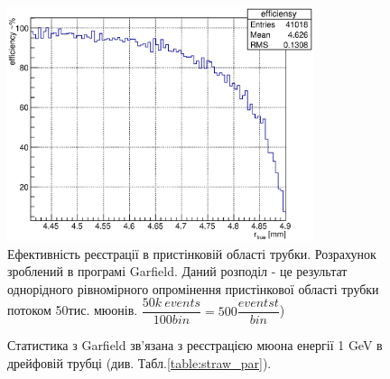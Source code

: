 \documentclass[pdftex,14pt]{scrartcl}
\begin{document}
	\begin{figure}[h!]
	\centering
	\includegraphics[width=0.8\textwidth]{periffEff}
	\caption{ Ефективність реєстрації в пристінковій області трубки. Розрахунок зроблений в програмі Garfield. Даний розподіл - це результат однорідного рівномірного опромінення пристінкової області трубки потоком 50тис. мюонів. $\dfrac{50k~events}{100 bin}  = 500 \dfrac{eventst}{bin}$)}
	\label{fig:efficiency}
	\end{figure}	
	
	\begin{figure}[h!]
		\centering
		\qquad
			\caption{ Статистика з Garfield зв’язана з реєстрацією мюона енергії 1 GeV в дрейфовій трубці (див. Табл.\ref{table:straw_par}).}
	\end{figure}
	
\end{document}
